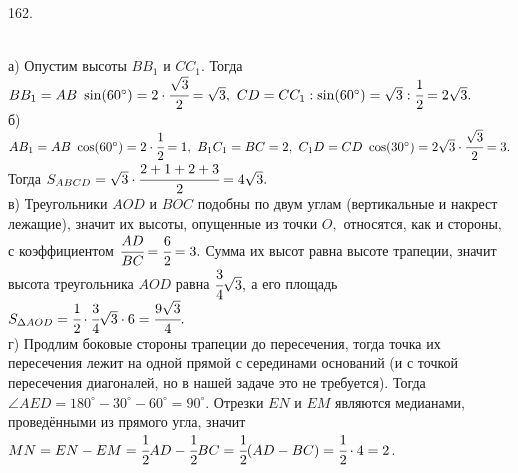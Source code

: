 162. \begin{figure}[ht!]
\end{figure}\\
а) Опустим высоты $BB_1$ и $CC_1.$ Тогда $BB_1=AB\ \sin(60^\circ)=2\cdot \cfrac{\sqrt{3}}{2}=\sqrt{3},\ CD=CC_1:\sin(60^\circ)=\sqrt{3}:\cfrac{1}{2}=2\sqrt{3}.$\\
б) $AB_1=AB\ \cos(60^\circ)=2 \cdot \cfrac{1}{2}=1,\ B_1C_1=BC=2,\ C_1D=CD\ \cos(30^\circ)=2\sqrt{3}\cdot \cfrac{\sqrt{3}}{2}=3.$ Тогда $S_{ABCD}=\sqrt{3}\cdot\cfrac{2+1+2+3}{2}=4\sqrt{3}.$\\
в) Треугольники $AOD$ и $BOC$ подобны по двум углам (вертикальные и накрест лежащие), значит их высоты, опущенные из точки $O,$ относятся, как и стороны, с коэффициентом $\cfrac{AD}{BC}=\cfrac{6}{2}=3.$ Сумма их высот равна высоте трапеции, значит высота треугольника $AOD$ равна $\cfrac{3}{4}\sqrt{3},$ а его площадь $S_{\Delta AOD}=\cfrac{1}{2}\cdot\cfrac{3}{4}\sqrt{3}\cdot6=\cfrac{9\sqrt{3}}{4}.$\\
г) Продлим боковые стороны трапеции до пересечения, тогда точка их пересечения лежит на одной прямой с серединами оснований (и с точкой пересечения диагоналей, но в нашей задаче это не требуется). Тогда $\angle AED=180^\circ-30^\circ-60^\circ=90^\circ.$ Отрезки $EN$ и $EM$ являются медианами, проведёнными из прямого угла, значит $MN=EN-EM=\cfrac{1}{2}AD-\cfrac{1}{2}BC=\cfrac{1}{2}(AD-BC)=\cfrac{1}{2}\cdot4=2$.\\
